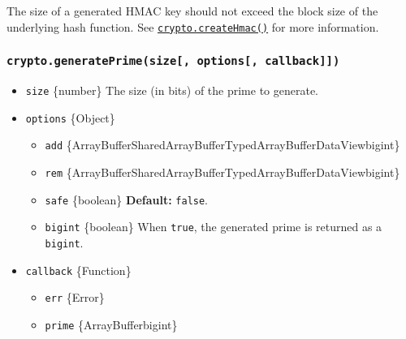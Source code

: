 \begin{Shaded}
\begin{Highlighting}[]
\NormalTok{ \{}
\OperatorTok{,}
\NormalTok{\} }\OperatorTok{=} \NormalTok{(}\NormalTok{)}\OperatorTok{;}

\OperatorTok{=} \NormalTok{(}\OperatorTok{,}\NormalTok{ \{ }\OperatorTok{:} \NormalTok{ \})}\OperatorTok{;}
\NormalTok{()}\NormalTok{(}\NormalTok{))}\OperatorTok{;}  
\end{Highlighting}
\end{Shaded}

The size of a generated HMAC key should not exceed the block size of the
underlying hash function. See
\hyperref[cryptocreatehmacalgorithm-key-options]{\texttt{crypto.createHmac()}}
for more information.

\subsubsection{\texorpdfstring{\texttt{crypto.generatePrime(size{[},\ options{[},\ callback{]}{]})}}{crypto.generatePrime(size{[}, options{[}, callback{]}{]})}}\label{crypto.generateprimesize-options-callback}

\begin{itemize}
\tightlist
\item
  \texttt{size} \{number\} The size (in bits) of the prime to generate.
\item
  \texttt{options} \{Object\}

  \begin{itemize}
  \tightlist
  \item
    \texttt{add}
    \{ArrayBuffer\textbar SharedArrayBuffer\textbar TypedArray\textbar Buffer\textbar DataView\textbar bigint\}
  \item
    \texttt{rem}
    \{ArrayBuffer\textbar SharedArrayBuffer\textbar TypedArray\textbar Buffer\textbar DataView\textbar bigint\}
  \item
    \texttt{safe} \{boolean\} \textbf{Default:} \texttt{false}.
  \item
    \texttt{bigint} \{boolean\} When \texttt{true}, the generated prime
    is returned as a \texttt{bigint}.
  \end{itemize}
\item
  \texttt{callback} \{Function\}

  \begin{itemize}
  \tightlist
  \item
    \texttt{err} \{Error\}
  \item
    \texttt{prime} \{ArrayBuffer\textbar bigint\}
  \end{itemize}
\end{itemize}

